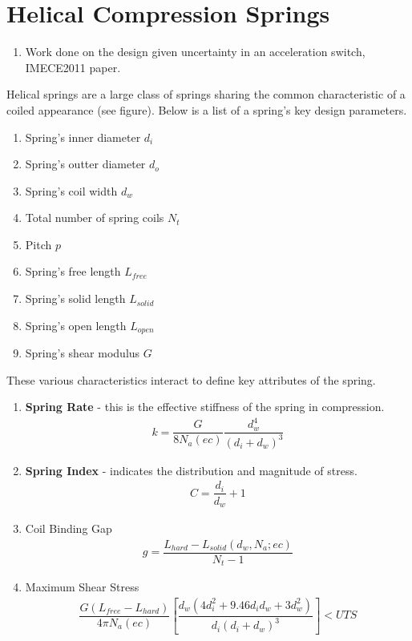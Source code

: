 \documentclass[11pt]{article}
\begin{document}
	\section{Helical Compression Springs}
	
	\begin{enumerate}
		
		\item Work done on the design given uncertainty in an acceleration switch, IMECE2011 paper.
		
	\end{enumerate}
		

Helical springs are a large class of springs sharing the common characteristic of a coiled appearance (see figure).  Below is a list of a spring's key design parameters.

		\begin{enumerate}
			\item Spring's inner diameter $d_{i}$ 
			\item Spring's outter diameter $d_{o}$
			\item Spring's coil width $d_{w}$
			\item Total number of spring coils $N_{t}$
			\item Pitch $p$
			\item Spring's free length $L_{free}$
			\item Spring's solid length $L_{solid}$
			\item Spring's open length $L_{open}$
			\item Spring's shear modulus $G$
		\end{enumerate}

These various characteristics interact to define key attributes of the spring.

	\begin{enumerate}
		\item \textbf{Spring Rate} - this is the effective stiffness of the spring in compression.
\begin{align*}
		k = \dfrac{G}{8 N_{a} (ec)} \dfrac{d_{w}^{4}}{(d_{i}+d_{w})^{3}}
\end{align*}
		\item \textbf{Spring Index} - indicates the distribution and magnitude of stress.
\begin{align*}
		C = \dfrac{d_{i}}{d_{w}} + 1
\end{align*}
		\item Coil Binding Gap
\begin{align*}
	g = \dfrac{L_{hard} - L_{solid}(d_{w},N_{a}; ec)}{N_{t} - 1}
\end{align*}
		\item Maximum Shear Stress
\begin{align*}
		\dfrac{G(L_{free} - L_{hard})}{4 \pi N_{a} (ec)} [\dfrac{d_{w} (4d_{i}^{2} + 9.46d_{i} 
d_{w} + 3 d_{w}^{2})}{d_{i}(d_{i}+d_{w})^{3}}] < UTS
\end{align*}
	\end{enumerate}
\end{document}
